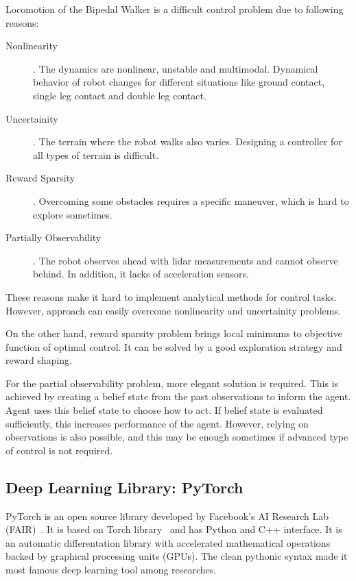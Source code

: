 Locomotion of the Bipedal Walker is a difficult control problem due to following reasons: 
\begin{description}
	\item[Nonlinearity]. The dynamics are nonlinear, unstable and multimodal. 
	Dynamical behavior of robot changes for different situations 
	like ground contact, single leg contact and double leg contact.
	\item[Uncertainity]. The terrain where the robot walks also varies. 
	Designing a controller for all types of terrain is difficult.
	\item[Reward Sparsity]. Overcoming some obstacles requires a specific maneuver, which is hard to explore sometimes.	
	\item[Partially Observability]. The robot observes 
	ahead with lidar measurements and cannot observe behind. 
	In addition, it lacks of acceleration sensors.
\end{description}

These reasons make it hard to implement analytical methods for control tasks. 
However, approach can easily overcome nonlinearity and uncertainity problems.

On the other hand, reward sparsity problem brings local minimums to objective function of optimal control. It can be solved by a good exploration strategy and reward shaping. 

For the partial observability problem, more elegant solution is required. 
This is achieved by creating a belief state from the past observations to inform the agent. 
Agent uses this belief state to choose how to act. 
If belief state is evaluated sufficiently, 
this increases performance of the agent.
However, relying on observations is also possible, 
and this may be enough sometimes if advanced type of control is not required. 

\subsection{Deep Learning Library: PyTorch}
\label{dl_pytorch}
PyTorch is an open source library developed by Facebook's AI Research Lab (FAIR)~\cite{paszke_pytorch_2019}. 
It is based on Torch library~\cite{collobert_torch7_2011} and has Python and C++ interface. 
It is an automatic differentation library with accelerated mathematical operations backed by graphical processing units (GPUs). 
The clean pythonic syntax made it most famous deep learning tool among researches. 
